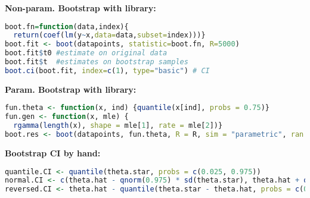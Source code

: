 \textbf{Non-param. Bootstrap with library: } 
\begin{lstlisting}[language=R]
boot.fn=function(data,index){
  return(coef(lm(y~x,data=data,subset=index)))}
boot.fit <- boot(datapoints, statistic=boot.fn, R=5000)
boot.fit$t0 #estimate on original data
boot.fit$t  #estimates on bootstrap samples
boot.ci(boot.fit, index=c(1), type="basic") # CI
\end{lstlisting}
\textbf{Param. Bootstrap with library:} 
\begin{lstlisting}[language=R]
fun.theta <- function(x, ind) {quantile(x[ind], probs = 0.75)}
fun.gen <- function(x, mle) {
  rgamma(length(x), shape = mle[1], rate = mle[2])}
boot.res <- boot(datapoints, fun.theta, R = R, sim = "parametric", ran.gen = fun.gen, mle = fit.gamma\$estimate)
\end{lstlisting}
\textbf{Bootstrap CI by hand:}
\begin{lstlisting}[language=R]
quantile.CI <- quantile(theta.star, probs = c(0.025, 0.975))
normal.CI <- c(theta.hat - qnorm(0.975) * sd(theta.star), theta.hat + qnorm(0.975) * sd(theta.star))
reversed.CI <- theta.hat - quantile(theta.star - theta.hat, probs = c(0.975, 0.025))
\end{lstlisting}